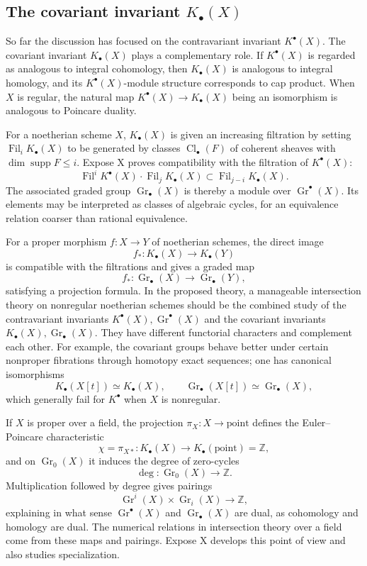 \documentclass[14pt]{extarticle}
\newcommand{\ZZ}{\mathbb Z}
\newcommand{\Fil}{\operatorname{Fil}}
\newcommand{\Gr}{\operatorname{Gr}}
\newcommand{\Cl}{\operatorname{Cl}}
\newcommand{\supp}{\operatorname{supp}}
\begin{document}
\subsection{The covariant invariant $K_{\bullet}(X)$}

So far the discussion has focused on the contravariant invariant $K^{\bullet}(X)$. The covariant invariant $K_{\bullet}(X)$ plays a complementary role. If $K^{\bullet}(X)$ is regarded as analogous to integral cohomology, then $K_{\bullet}(X)$ is analogous to integral homology, and its $K^{\bullet}(X)$-module structure corresponds to cap product. When $X$ is regular, the natural map $K^{\bullet}(X)\to K_{\bullet}(X)$ being an isomorphism is analogous to Poincare duality.

For a noetherian scheme $X$, $K_{\bullet}(X)$ is given an increasing filtration by setting $\Fil_iK_{\bullet}(X)$ to be generated by classes $\Cl_{\bullet}(F)$ of coherent sheaves with $\dim\supp F\leq i$. Expose X proves compatibility with the filtration of $K^{\bullet}(X)$:
\begin{equation}\label{eq:capfiltration}
   \Fil^iK^{\bullet}(X)\cdot\Fil_jK_{\bullet}(X)
   \subset \Fil_{j-i}K_{\bullet}(X).
\end{equation}
The associated graded group $\Gr_{\bullet}(X)$ is thereby a module over $\Gr^{\bullet}(X)$. Its elements may be interpreted as classes of algebraic cycles, for an equivalence relation coarser than rational equivalence.

For a proper morphism $f:X\to Y$ of noetherian schemes, the direct image
\[
   f_*:K_{\bullet}(X)\to K_{\bullet}(Y)
\]
is compatible with the filtrations and gives a graded map
\[
   f_*:\Gr_{\bullet}(X)\to\Gr_{\bullet}(Y),
\]
satisfying a projection formula. In the proposed theory, a manageable intersection theory on nonregular noetherian schemes should be the combined study of the contravariant invariants $K^{\bullet}(X),\Gr^{\bullet}(X)$ and the covariant invariants $K_{\bullet}(X),\Gr_{\bullet}(X)$. They have different functorial characters and complement each other. For example, the covariant groups behave better under certain nonproper fibrations through homotopy exact sequences; one has canonical isomorphisms
\[
   K_{\bullet}(X[t])\simeq K_{\bullet}(X),\qquad
   \Gr_{\bullet}(X[t])\simeq \Gr_{\bullet}(X),
\]
which generally fail for $K^{\bullet}$ when $X$ is nonregular.

If $X$ is proper over a field, the projection $\pi_X:X\to\mathrm{point}$ defines the Euler--Poincare characteristic
\[
   \chi=\pi_{X*}:K_{\bullet}(X)\to K_{\bullet}(\mathrm{point})=\ZZ,
\]
and on $\Gr_0(X)$ it induces the degree of zero-cycles
\[
   \deg:\Gr_0(X)\to\ZZ.
\]
Multiplication followed by degree gives pairings
\[
   \Gr^i(X)\times \Gr_i(X)\to\ZZ,
\]
explaining in what sense $\Gr^{\bullet}(X)$ and $\Gr_{\bullet}(X)$ are dual, as cohomology and homology are dual. The numerical relations in intersection theory over a field come from these maps and pairings. Expose X develops this point of view and also studies specialization.
\end{document}
